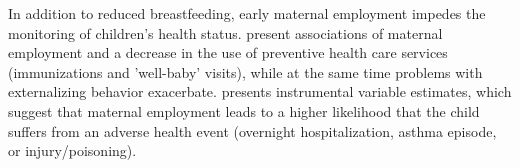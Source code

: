 \documentclass[11pt, a4paper]{article} %
\begin{document}
In addition to reduced breastfeeding, early maternal employment impedes the monitoring of children's health status. \cite{berger2005earlymaternal} present associations of maternal employment and a decrease in the use of preventive health care services (immunizations and 'well-baby' visits), while at the same time problems with externalizing behavior exacerbate. \cite{morrill2011} presents instrumental variable estimates, which suggest that maternal employment leads to a higher likelihood that the child suffers from an adverse health event (overnight hospitalization, asthma episode, or injury/poisoning).\newline 









\end{document}
